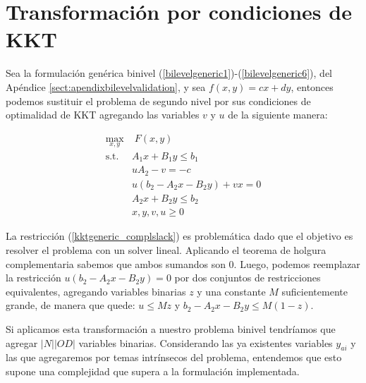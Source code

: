 \chapter{Transformación por condiciones de KKT}
\label{sec:kkttransform}

Sea la formulación genérica binivel (\ref{bilevelgeneric1})-(\ref{bilevelgeneric6}), del Apéndice \ref{sect:apendixbilevelvalidation}, y sea $f(x, y) = cx + dy$, entonces podemos sustituir el problema de segundo nivel por sus condiciones de optimalidad de KKT agregando las variables $v$ y $u$ de la siguiente manera:

\begin{align}
\max_{x,y}              & \; F(x, y) \label{kktgeneric1} \\
\text{s.t.}             & A_1 x + B_1 y \leq b_1 \\
                        & uA_2 - v = -c \\
                        & u(b_2 - A_2x - B_2y) + vx = 0 \label{kktgeneric_complslack} \\
                        & A_2 x + B_2 y \leq b_2 \label{kktgeneric5} \\
                        & x, y, v, u \geq 0 \label{kktgeneric6}
\end{align}

La restricción (\ref{kktgeneric_complslack}) es problemática dado que el objetivo es resolver el problema con un solver lineal. Aplicando el teorema de holgura complementaria sabemos que ambos sumandos son 0. Luego, podemos reemplazar la restricción $u(b_2 - A_2x - B_2y) = 0$ por dos conjuntos de restricciones equivalentes, agregando variables binarias $z$ y una constante $M$ suficientemente grande, de manera que quede: $u \leq Mz$ y $b_2 - A_2x - B_2y \leq M(1-z)$.

Si aplicamos esta transformación a nuestro problema binivel tendríamos que agregar $|N| |OD|$ variables binarias. Considerando las ya existentes variables $y_{ai}$ y las que agregaremos por temas intrínsecos del problema, entendemos que esto supone una complejidad que supera a la formulación implementada.

